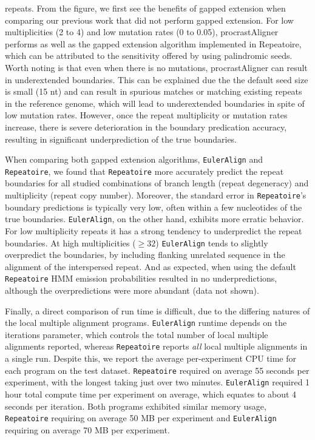 \documentclass[12pt,journal,draftcls,letterpaper,onecolumn]{IEEEtran}
\begin{document}
repeats. From the figure, we first see the benefits of gapped extension when comparing our previous work
that did not perform gapped extension. For low multiplicities (2 to 4) and low mutation rates (0 to 0.05), procrastAligner performs as well
as the gapped extension algorithm implemented in Repeatoire, which can be attributed to the sensitivity offered by using palindromic seeds. Worth noting is that even when there is no mutations, procrastAligner can result in underextended boundaries. This can be explained due the the default seed size is small (15 nt) and can result in spurious matches or matching existing repeats in the reference genome, which will lead to underextended boundaries in spite of low mutation rates. However, once the repeat multiplicity or mutation rates increase, there is severe deterioration in the boundary predication accuracy, resulting in significant underprediction of the true boundaries.

When comparing both gapped extension algorithms, \texttt{EulerAlign} and \texttt{Repeatoire}, we found that \texttt{Repeatoire} more accurately predict
the repeat boundaries for all studied combinations of branch length (repeat degeneracy)
and multiplicity (repeat copy number).  Moreover, the standard error in \texttt{Repeatoire}'s
boundary predictions is typically very low, often within a few nucleotides of the true boundaries.  \texttt{EulerAlign}, on the other hand,
exhibits more erratic behavior.  For low multiplicity repeats it has a strong tendency to
underpredict the repeat boundaries.  At high multiplicities ($\geq32$) \texttt{EulerAlign} tends to
slightly overpredict the boundaries, by including flanking unrelated sequence in the alignment of
the interspersed repeat.  And as expected, when using the default \texttt{Repeatoire} HMM emission probabilities resulted in no underpredictions, although the overpredictions were more abundant (data not shown).


Finally, a direct comparison of run time is difficult, due to the differing natures of the local multiple alignment programs.  \texttt{EulerAlign} runtime depends on the iterations parameter, which controls the total number of local multiple alignments reported, whereas \texttt{Repeatoire} reports \textit{all} local multiple alignments in a single run.  Despite this, we report the average per-experiment CPU time for each program on the test dataset. \texttt{Repeatoire} required on average 55 seconds per experiment, with the longest taking just over two minutes. \texttt{EulerAlign} required 1 hour total compute time per experiment on average, which equates to about 4 seconds per iteration.  Both programs exhibited similar memory usage, \texttt{Repeatoire} requiring on average 50 MB per experiment and \texttt{EulerAlign} requiring on average 70 MB per experiment.
\end{document}

